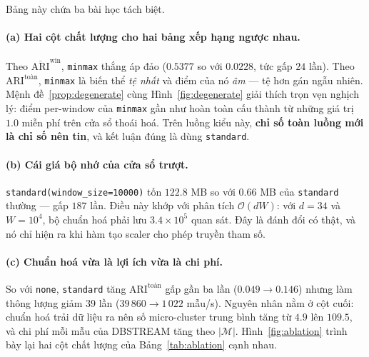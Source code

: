 \documentclass[11pt,a4paper]{article}
\theoremstyle{remark}
\begin{document}
Bảng này chứa ba bài học tách biệt.

\paragraph{(a) Hai cột chất lượng cho hai bảng xếp hạng ngược nhau.}
Theo $\overline{\mathrm{ARI}}^{\text{win}}$, \texttt{minmax} thắng áp đảo
($0.5377$ so với $0.0228$, tức gấp $24$ lần). Theo $\mathrm{ARI}^{\text{toàn}}$,
\texttt{minmax} là biến thể \emph{tệ nhất} và điểm của nó \emph{âm} --- tệ hơn
gán ngẫu nhiên. Mệnh đề~\ref{prop:degenerate} cùng Hình~\ref{fig:degenerate}
giải thích trọn vẹn nghịch lý: điểm per-window của \texttt{minmax} gần như hoàn
toàn cấu thành từ những giá trị $1.0$ miễn phí trên cửa sổ thoái hoá. Trên luồng
kiểu này, \textbf{chỉ số toàn luồng mới là chỉ số nên tin}, và kết luận đúng là
dùng \texttt{standard}.

\paragraph{(b) Cái giá bộ nhớ của cửa sổ trượt.}
\texttt{standard(window\_size=10000)} tốn $122.8$ MB so với $0.66$ MB của
\texttt{standard} thường --- gấp $187$ lần. Điều này khớp với phân tích
$\mathcal{O}(dW)$: với $d=34$ và $W=10^4$, bộ chuẩn hoá phải lưu $3.4\times10^5$
quan sát. Đây là đánh đổi có thật, và nó chỉ hiện ra khi hàm tạo scaler cho phép
truyền tham số.

\paragraph{(c) Chuẩn hoá vừa là lợi ích vừa là chi phí.}
So với \texttt{none}, \texttt{standard} tăng $\mathrm{ARI}^{\text{toàn}}$ gấp
gần ba lần ($0.049 \to 0.146$) nhưng làm thông lượng giảm $39$ lần
($39\,860 \to 1\,022$ mẫu/s). Nguyên nhân nằm ở cột cuối: chuẩn hoá trải dữ liệu
ra nên số micro-cluster trung bình tăng từ $4.9$ lên $109.5$, và chi phí mỗi mẫu
của DBSTREAM tăng theo $|\mathcal{M}|$. Hình~\ref{fig:ablation} trình bày lại
hai cột chất lượng của Bảng~\ref{tab:ablation} cạnh nhau.
\end{document}
